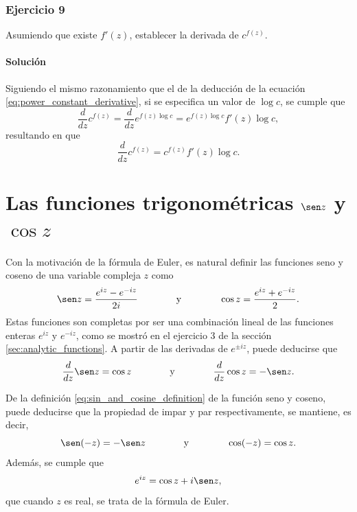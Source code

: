 \documentclass[a4paper]{report}
\begin{document}
\subsubsection{Ejercicio 9}

Asumiendo que existe \(f'(z)\), establecer la derivada de \(c^{f(z)}\). 

\paragraph{Solución} Siguiendo el mismo razonamiento que el de la deducción de la ecuación \ref{eq:power_constant_derivative}, si se especifica un valor de \(\log c\), se cumple que 
\[
 \frac{d}{dz}c^{f(z)}=\frac{d}{dz}e^{f(z)\log c}=e^{f(z)\log c}f'(z)\log c,
\]
resultando en que 
\[
 \frac{d}{dz}c^{f(z)}=c^{f(z)}f'(z)\log c.
\]

\section{Las funciones trigonométricas \texorpdfstring{\(\sen z\)}{sen z} y \texorpdfstring{\(\cos z\)}{cos z}}\label{sec:trigonometric_functions_sin_and_cos}

Con la motivación de la fórmula de Euler, es natural definir las funciones seno y coseno de una variable compleja \(z\) como
\begin{equation}\label{eq:sin_and_cosine_definition}
 \sen z=\frac{e^{iz}-e^{-iz}}{2i}
 \qquad\qquad\textrm{y}\qquad\qquad 
 \cos z=\frac{e^{iz}+e^{-iz}}{2}. 
\end{equation}
Estas funciones son completas por ser una combinación lineal de las funciones enteras \(e^{iz}\) y \(e^{-iz}\), como se mostró en el ejercicio 3 de la sección \ref{sec:analytic_functions}. A partir de las derivadas de \(e^{\pm iz}\), puede deducirse que
\begin{equation}\label{eq:sin_and_cosine_derivatives}
 \frac{d}{dz}\sen z=\cos z
 \qquad\qquad\textrm{y}\qquad\qquad 
 \frac{d}{dz}\cos z=-\sen z. 
\end{equation}

De la definición \ref{eq:sin_and_cosine_definition} de la función seno y coseno, puede deducirse que la propiedad de impar y par respectivamente, se mantiene, es decir,
\begin{equation}\label{eq:sin_and_cosine_odd_even}
 \sen(-z)=-\sen z
 \qquad\qquad\textrm{y}\qquad\qquad 
 \cos(-z)=\cos z. 
\end{equation}
Además, se cumple que 
\begin{equation}\label{eq:euler_formula}
 e^{iz}=\cos z+i\sen z, 
\end{equation}
que cuando \(z\) es real, se trata de la fórmula de Euler.
\end{document}
